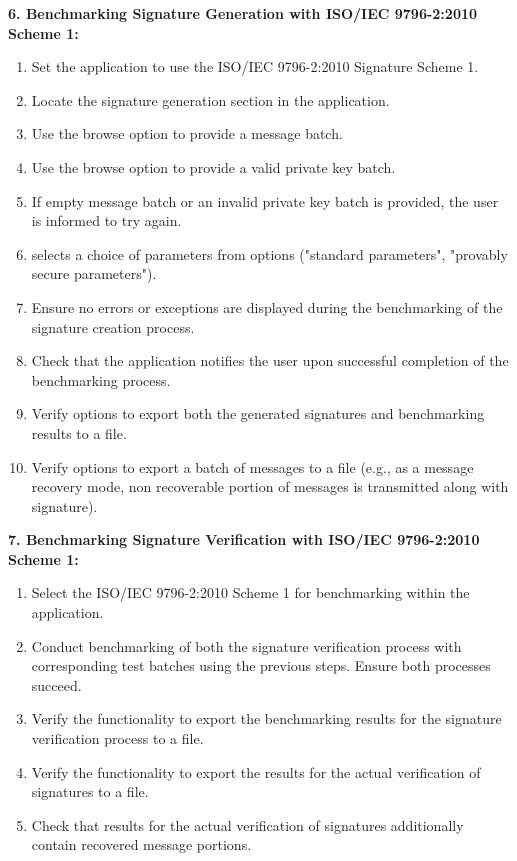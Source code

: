 \documentclass[]{final_report}
\theoremstyle{definition}
\begin{document}
\textbf{6. Benchmarking Signature Generation with ISO/IEC 9796-2:2010 Scheme 1:}
\begin{enumerate}
\item Set the application to use the ISO/IEC 9796-2:2010 Signature Scheme 1.
\item Locate the signature generation section in the application.
\item Use the browse option to provide a message batch.
\item Use the browse option to provide a valid private key batch.
\item If empty message batch or an invalid private key batch is provided, the user is informed to try again. 
\item selects a choice of parameters from options ("standard parameters", "provably secure parameters").
\item Ensure no errors or exceptions are displayed during the benchmarking of the signature creation process.
\item Check that the application notifies the user upon successful completion of the benchmarking process.
\item Verify options to export both the generated signatures and benchmarking results to a file.
\item Verify options to export a batch of messages to a file (e.g., as a message recovery mode, non recoverable portion of messages is transmitted along with signature).
\end{enumerate}

\textbf{7. Benchmarking Signature Verification with ISO/IEC 9796-2:2010 Scheme 1:}
\begin{enumerate}
\item Select the ISO/IEC 9796-2:2010 Scheme 1 for benchmarking within the application.
\item Conduct benchmarking of both the signature verification process with corresponding test batches using the previous steps. Ensure both processes succeed.
\item Verify the functionality to export the benchmarking results for the signature verification process to a file.
\item Verify the functionality to export the results for the actual verification of signatures to a file.
\item Check that results for the actual verification of signatures additionally contain recovered message portions.
\end{enumerate}
\end{document}
